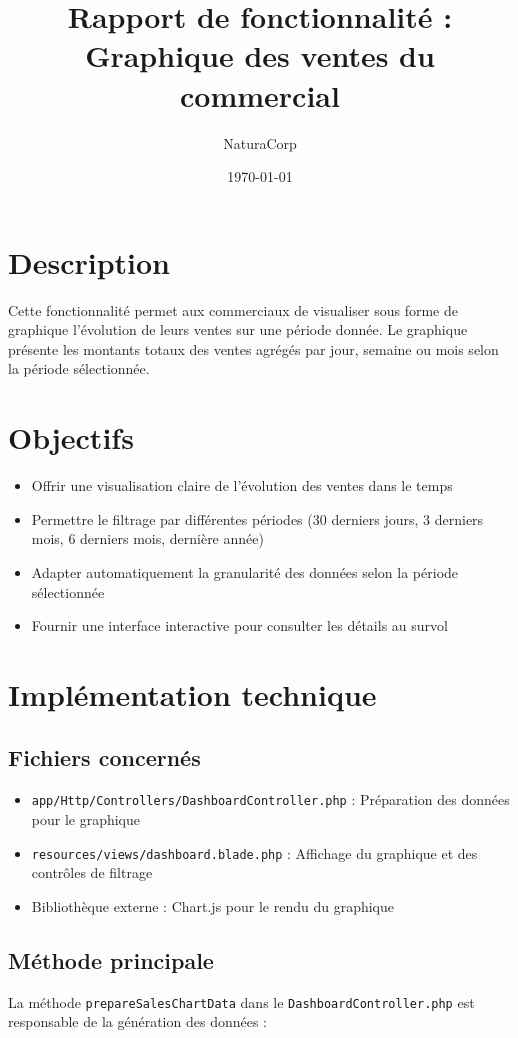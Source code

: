 \documentclass[12pt,a4paper]{article}
\title{Rapport de fonctionnalité : Graphique des ventes du commercial}
\author{NaturaCorp}
\date{\today}
\begin{document}
\maketitle

\section{Description}
Cette fonctionnalité permet aux commerciaux de visualiser sous forme de graphique l'évolution de leurs ventes sur une période donnée. Le graphique présente les montants totaux des ventes agrégés par jour, semaine ou mois selon la période sélectionnée.

\section{Objectifs}
\begin{itemize}
    \item Offrir une visualisation claire de l'évolution des ventes dans le temps
    \item Permettre le filtrage par différentes périodes (30 derniers jours, 3 derniers mois, 6 derniers mois, dernière année)
    \item Adapter automatiquement la granularité des données selon la période sélectionnée
    \item Fournir une interface interactive pour consulter les détails au survol
\end{itemize}

\section{Implémentation technique}

\subsection{Fichiers concernés}
\begin{itemize}
    \item \texttt{app/Http/Controllers/DashboardController.php} : Préparation des données pour le graphique
    \item \texttt{resources/views/dashboard.blade.php} : Affichage du graphique et des contrôles de filtrage
    \item Bibliothèque externe : Chart.js pour le rendu du graphique
\end{itemize}

\subsection{Méthode principale}
La méthode \texttt{prepareSalesChartData} dans le \texttt{DashboardController.php} est responsable de la génération des données :
\end{document}

